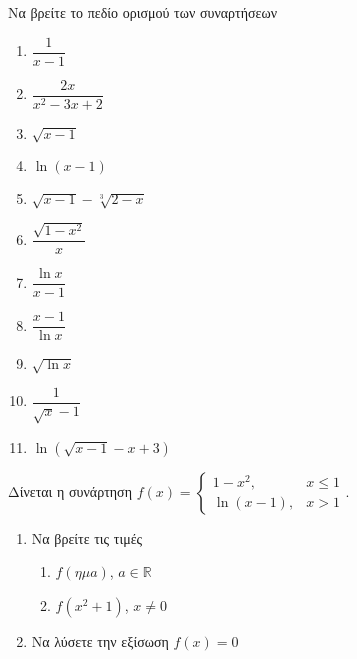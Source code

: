 \documentclass{presentation}
\begin{document}
\begin{askisi}
      Να βρείτε το πεδίο ορισμού των συναρτήσεων

      \begin{multicols}{2}
            \begin{enumerate}
                  \item<1-> $\dfrac{1}{x-1}$
                  \item<2-> $\dfrac{2x}{x^2-3x+2}$
                  \item<3-> $\sqrt{x-1}$
                  \item<4-> $\ln (x-1)$
                  \item<5-> $\sqrt{x-1}-\sqrt[3]{2-x}$
                  \item<6-> $\dfrac{\sqrt{1-x^2}}{x}$
                  \item<7-> $\dfrac{\ln x}{x-1}$
                  \item<8-> $\dfrac{x-1}{\ln x}$
                  \item<9-> $\sqrt{\ln x}$
                  \item<10-> $\dfrac{1}{\sqrt{x}-1}$
                  \item<11-> $\ln \left(\sqrt{x-1}-x+3\right)$
            \end{enumerate}
      \end{multicols}
\end{askisi}

\begin{askisi}
      Δίνεται η συνάρτηση $f(x)=\begin{cases}
                  1-x^2,     & x\le 1 \\
                  \ln (x-1), & x>1
            \end{cases}$.
      \begin{enumerate}
            \item<1-> Να βρείτε τις τιμές
                  \begin{enumerate}
                        \item<1-> $f(ημ a)$, $a\in\mathbb{R}$
                        \item<2-> $f(x^2+1)$, $x\ne 0$
                  \end{enumerate}
            \item<3-> Να λύσετε την εξίσωση $f(x)=0$
      \end{enumerate}
\end{askisi}
\end{document}
